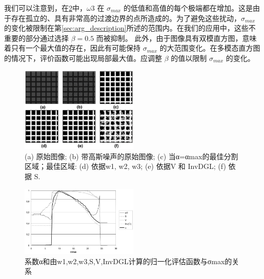 我们可以注意到，在\cref{fig:评估函数}中，$\omega3$ 在 $\sigma_{max}$ 的低值和高值的每个极端都在增加。这是由于存在孤立的、具有非常高的过渡边界的点所造成的。为了避免这些扰动，$\sigma_{max}$ 的变化被限制在第\cref{sec:arg_description}所述的范围内。在我们的应用中，这些不重要的部分通过选择 $\beta=0.5$ 而被抑制。 此外，由于图像具有双模直方图，意味着只有一个最大值的存在，因此有可能保持 $\sigma_{max}$ 的大范围变化。在多模态直方图的情况下，评价函数可能出现局部最大值。应调整 $\beta$ 的值以限制 $\sigma_{max}$ 的变化。

\begin{figure}[htbp]
    \centering
    \includegraphics[width=0.5\textwidth]{figures/人工图像测试.png}
    \caption{(a) 原始图像; (b) 带高斯噪声的原始图像; (c) 当α=αmax的最佳分割区域；最佳区域: (d) 依据w1, w2, w3; (e) 依据V 和 InvDGL; (f) 依据 S.}
    \label{fig:人工图像测试}
\end{figure}

\begin{figure}[htbp]
    \centering
    \includegraphics[width=0.5\textwidth]{figures/评估函数.png}
    \caption{系数α和由w1,w2,w3,S,V,InvDGL计算的归一化评估函数与σmax的关系}
    \label{fig:评估函数}
\end{figure}
